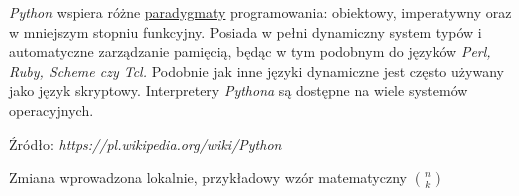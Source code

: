 \textit{Python} wspiera różne \underline{paradygmaty} programowania: obiektowy, imperatywny oraz w mniejszym stopniu funkcyjny. Posiada w pełni dynamiczny system typów i automatyczne zarządzanie pamięcią, będąc w tym podobnym do języków \textit{Perl, Ruby, Scheme czy Tcl.} Podobnie jak inne języki dynamiczne jest często używany jako język skryptowy. Interpretery \emph{Pythona} są dostępne na wiele systemów operacyjnych.

Źródło: \emph{https://pl.wikipedia.org/wiki/Python}

Zmiana wprowadzona lokalnie, przykładowy wzór matematyczny ${n \choose k}$